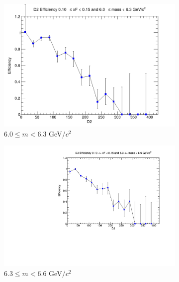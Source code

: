 \documentclass[11pt]{article}
\begin{document}
\begin{figure}[p]
\begin{subfigure}[b]{0.32\textwidth}
        \includegraphics[width=\textwidth]{./kTrackerEfficiencyPlots/D2_Efficiency_xF2_mass6.png}
        \caption{$6.0 \leq m < 6.3$ GeV/$c^2$}
    \end{subfigure}\hfill
    \begin{subfigure}[b]{0.32\textwidth}
        \centering
        \includegraphics[width=\textwidth]{./kTrackerEfficiencyPlots/D2_Efficiency_xF2_mass7.pdf}
        \caption{$6.3 \leq m < 6.6$ GeV/$c^2$}
    \end{subfigure}\hfill
    \begin{subfigure}[b]{0.32\textwidth}
        \centering

\end{subfigure}
\end{figure}
\end{document}
